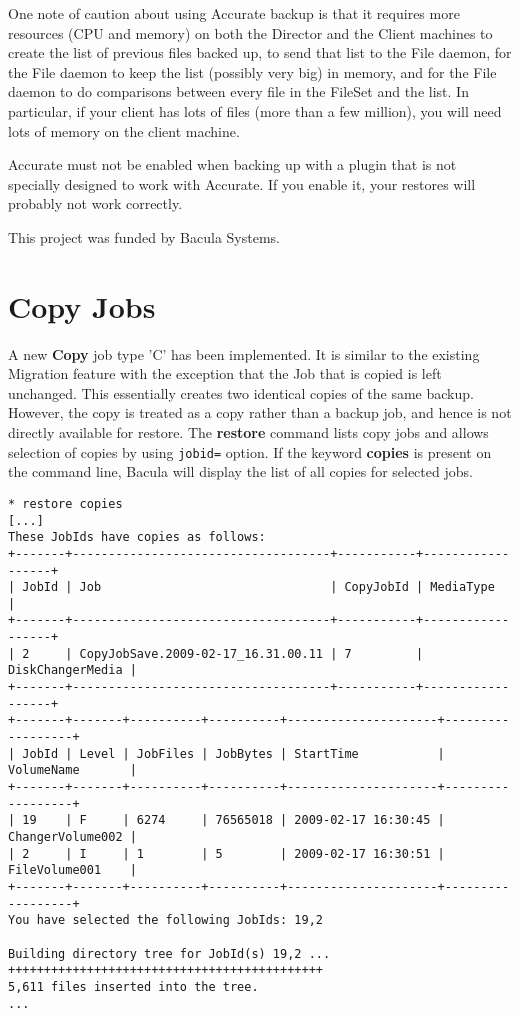 One note of caution
about using Accurate backup is that it requires more resources (CPU and memory)
on both the Director and the Client machines to create the list of previous
files backed up, to send that list to the File daemon, for the File daemon to
keep the list (possibly very big) in memory, and for the File daemon to do
comparisons between every file in the FileSet and the list.  In particular,
if your client has lots of files (more than a few million), you will need
lots of memory on the client machine.

Accurate must not be enabled when backing up with a plugin that is not
specially designed to work with Accurate. If you enable it, your restores
will probably not work correctly.

This project was funded by Bacula Systems.
                                       


\section{Copy Jobs}

A new {\bf Copy} job type 'C' has been implemented. It is similar to the
existing Migration feature with the exception that the Job that is copied is
left unchanged.  This essentially creates two identical copies of the same
backup. However, the copy is treated as a copy rather than a backup job, and
hence is not directly available for restore.  The {\bf restore} command lists
copy jobs and allows selection of copies by using \texttt{jobid=}
option. If the keyword {\bf copies} is present on the command line, Bacula will
display the list of all copies for selected jobs.

\begin{verbatim}
* restore copies
[...]
These JobIds have copies as follows:
+-------+------------------------------------+-----------+------------------+
| JobId | Job                                | CopyJobId | MediaType        |
+-------+------------------------------------+-----------+------------------+
| 2     | CopyJobSave.2009-02-17_16.31.00.11 | 7         | DiskChangerMedia |
+-------+------------------------------------+-----------+------------------+
+-------+-------+----------+----------+---------------------+------------------+
| JobId | Level | JobFiles | JobBytes | StartTime           | VolumeName       |
+-------+-------+----------+----------+---------------------+------------------+
| 19    | F     | 6274     | 76565018 | 2009-02-17 16:30:45 | ChangerVolume002 |
| 2     | I     | 1        | 5        | 2009-02-17 16:30:51 | FileVolume001    |
+-------+-------+----------+----------+---------------------+------------------+
You have selected the following JobIds: 19,2

Building directory tree for JobId(s) 19,2 ...  ++++++++++++++++++++++++++++++++++++++++++++
5,611 files inserted into the tree.
...
\end{verbatim}


